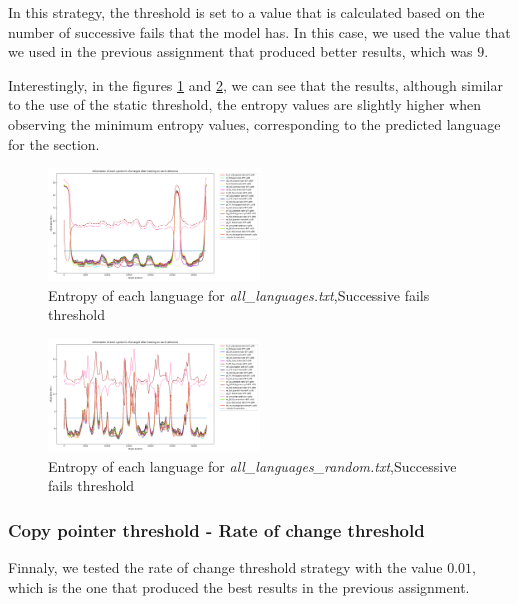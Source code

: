 \documentclass{article}
\begin{document}
In this strategy, the threshold is set to a value that is calculated based on the number of successive fails that the model has.
In this case, we used the value that we used in the previous assignment that produced better results, which was $9$.

Interestingly, in the figures \ref{fig:all_languages_t_f} and \ref{fig:all_languages_random_t_f}, we can see that the results, although similar to the use of the static threshold,
the entropy values are slightly higher when observing the minimum entropy values, corresponding to the predicted language for the section.

\begin{figure}
    \centering
    \includegraphics[width=0.5\textwidth]{../results/all_languages/-t_f:9.png}
    \caption{Entropy of each language for \textit{all\_languages.txt},Successive fails threshold}
    \label{fig:all_languages_t_f}
\end{figure}

\begin{figure}
    \centering
    \includegraphics[width=0.5\textwidth]{../results/all_languages_random/-t_f:9.png}
    \caption{Entropy of each language for \textit{all\_languages\_random.txt},Successive fails threshold}
    \label{fig:all_languages_random_t_f}
\end{figure}

\subsubsection{Copy pointer threshold - Rate of change threshold}
\label{subsubsec:results_locate_lang_rate_of_change_threshold}

Finnaly, we tested the rate of change threshold strategy with the value $0.01$, which is the one that produced the best results in the previous assignment.
\end{document}
